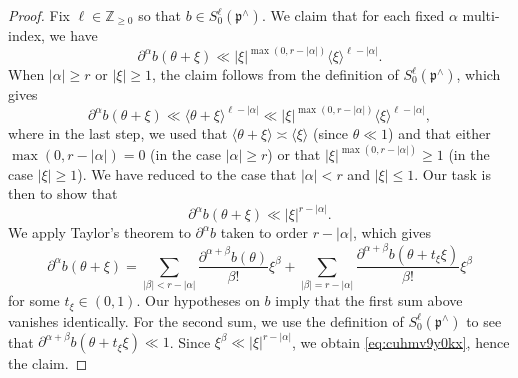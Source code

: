 \begin{proof}
  Fix $\ell \in \mathbb{Z}_{\geq 0}$ so that $b \in S^\ell_{0}(\mathfrak{p}^\wedge)$.  We claim that for each fixed $\alpha$ multi-index, we have
  \begin{equation}\label{eq:cuhmv966ci}
    \partial^\alpha b(\theta + \xi ) \ll |\xi|^{\max(0, r - |\alpha|)} \langle \xi  \rangle^{\ell - |\alpha|}.
  \end{equation}
  When $\lvert \alpha \rvert \geq r$ or $\lvert \xi \rvert \geq 1$, the claim follows from the definition of $S_0^{\ell}(\mathfrak{p}^\wedge)$, which gives
  \begin{equation*}
    \partial^\alpha b(\theta + \xi) \ll \langle \theta + \xi \rangle^{\ell - \lvert \alpha \rvert}
    \ll |\xi|^{\max(0, r - |\alpha|)} \langle \xi  \rangle^{\ell - |\alpha|},
  \end{equation*}
  where in the last step, we used that $\langle \theta + \xi \rangle \asymp \langle \xi \rangle$ (since $\theta \ll 1$) and that either $\max(0, r - \lvert \alpha \rvert) = 0$ (in the case $\lvert \alpha \rvert \geq r$) or that $\lvert \xi \rvert^{\max(0, r - \lvert \alpha \rvert)} \geq 1$ (in the case $\lvert \xi \rvert \geq 1$).  We have reduced to the case that $\lvert \alpha \rvert < r$ and $\lvert \xi \rvert \leq 1$.  Our task is then to show that
  \begin{equation}\label{eq:cuhmv9y0kx}
    \partial^\alpha b(\theta + \xi) \ll \lvert \xi \rvert^{r - \lvert \alpha \rvert}.
  \end{equation}
  We apply Taylor's theorem to $\partial^\alpha b$ taken to order $r - \lvert \alpha \rvert$, which gives
  \begin{equation*}
    \partial^\alpha b(\theta + \xi)
    = \sum_{\lvert \beta \rvert < r - \lvert \alpha \rvert}
    \frac{\partial^{\alpha + \beta} b(\theta)}{\beta !} \xi^\beta
    +
    \sum_{\lvert \beta \rvert = r - \lvert \alpha \rvert}
    \frac{\partial^{\alpha + \beta} b(\theta + t_\xi \xi)}{\beta!} \xi^\beta
  \end{equation*}
  for some $t_\xi \in(0, 1)$.  Our hypotheses on $b$ imply that the first sum above vanishes identically.  For the second sum, we use the definition of $S_0^{\ell}(\mathfrak{p}^\wedge)$ to see that $\partial^{\alpha + \beta} b(\theta + t_\xi \xi) \ll 1$.  Since $\xi^\beta \ll \lvert \xi \rvert^{r - \lvert \alpha \rvert}$, we obtain \eqref{eq:cuhmv9y0kx}, hence the claim.


\end{proof}
